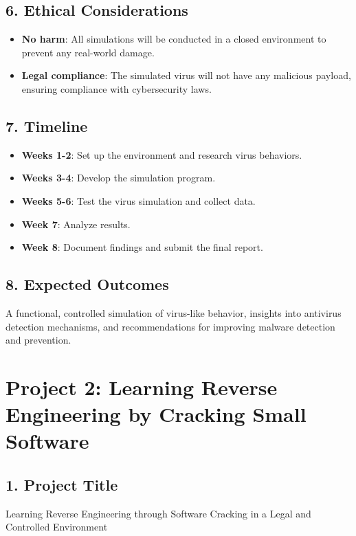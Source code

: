 \documentclass{article}
\begin{document}
\subsection*{6. Ethical Considerations}
\begin{itemize}
    \item \textbf{No harm}: All simulations will be conducted in a closed environment to prevent any real-world damage.
    \item \textbf{Legal compliance}: The simulated virus will not have any malicious payload, ensuring compliance with cybersecurity laws.
\end{itemize}

\subsection*{7. Timeline}
\begin{itemize}
    \item \textbf{Weeks 1-2}: Set up the environment and research virus behaviors.
    \item \textbf{Weeks 3-4}: Develop the simulation program.
    \item \textbf{Weeks 5-6}: Test the virus simulation and collect data.
    \item \textbf{Week 7}: Analyze results.
    \item \textbf{Week 8}: Document findings and submit the final report.
\end{itemize}

\subsection*{8. Expected Outcomes}
A functional, controlled simulation of virus-like behavior, insights into antivirus detection mechanisms, and recommendations for improving malware detection and prevention.

\newpage

\section*{Project 2: Learning Reverse Engineering by Cracking Small Software}

\subsection*{1. Project Title}
Learning Reverse Engineering through Software Cracking in a Legal and Controlled Environment
\end{document}
